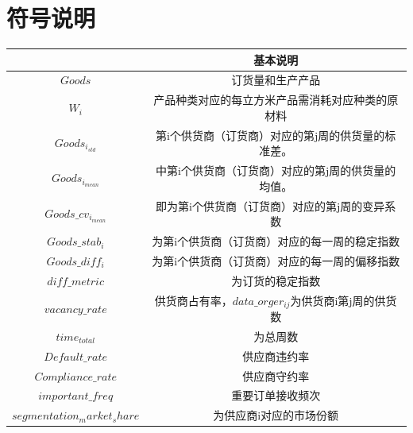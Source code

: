 \documentclass[UTF8]{ctexart}
\begin{document}
\section{符号说明}
\begin{table}[!htbp]
	\begin{center}
		\begin{tabular}{c|c}
			\toprule[2pt]
			\rowcolor[gray]{0.8}

			\multicolumn{1}{m{15em}}{\centering 符号} & \multicolumn{1}{m{30em}}{\centering 基本说明}          \\


			\midrule[1.3pt]
			$Goods$                                  & 订货量和生产产品                                       \\
			$W_i$                                    & 产品种类对应的每立方米产品需消耗对应种类的原材料       \\
			$Goods_{i_{std}}$                        & 第i个供货商（订货商）对应的第j周的供货量的标准差。     \\
			$Goods_{i_{mean}}$                       & 中第i个供货商（订货商）对应的第j周的供货量的均值。     \\
			$Goods\_{cv}_{i_{mean}}$                 & 即为第i个供货商（订货商）对应的第j周的变异系数         \\
			$Goods\_stab_{i}$                        & 为第i个供货商（订货商）对应的每一周的稳定指数          \\
			$Goods\_diff_{i}$                        & 为第i个供货商（订货商）对应的每一周的偏移指数          \\
			$diff\_metric$                           & 为订货的稳定指数                                       \\
			$vacancy\_rate$                          & 供货商占有率，$data\_orger_{ij}$为供货商i第j周的供货数 \\
			$time_{total}$                           & 为总周数                                               \\
			$Default\_rate$                          & 供应商违约率                                           \\
			$Compliance\_{rate}$                     & 供应商守约率                                           \\
			$important\_freq$                        & 重要订单接收频次                                       \\

			$segmentation_market_share$              & 为供应商i对应的市场份额                                \\

			\bottomrule[2pt]
		\end{tabular}
	\end{center}
\end{table}
\end{document}
